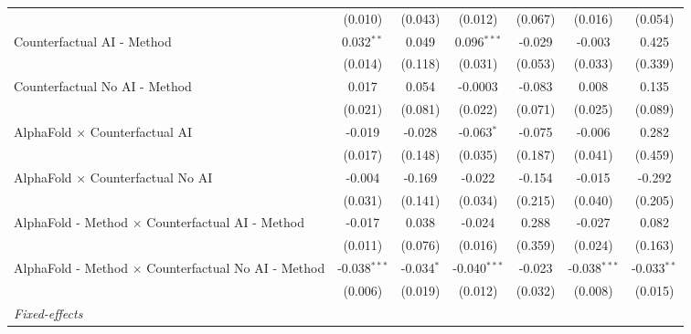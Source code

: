 \begin{tabular}{lcccccc}
                                                              & (0.010)        & (0.043)      & (0.012)        & (0.067)      & (0.016)        & (0.054)\\   
   Counterfactual AI - Method                                 & 0.032$^{**}$   & 0.049        & 0.096$^{***}$  & -0.029       & -0.003         & 0.425\\   
                                                              & (0.014)        & (0.118)      & (0.031)        & (0.053)      & (0.033)        & (0.339)\\   
   Counterfactual No AI - Method                              & 0.017          & 0.054        & -0.0003        & -0.083       & 0.008          & 0.135\\   
                                                              & (0.021)        & (0.081)      & (0.022)        & (0.071)      & (0.025)        & (0.089)\\   
   AlphaFold $\times$ Counterfactual AI                       & -0.019         & -0.028       & -0.063$^{*}$   & -0.075       & -0.006         & 0.282\\   
                                                              & (0.017)        & (0.148)      & (0.035)        & (0.187)      & (0.041)        & (0.459)\\   
   AlphaFold $\times$ Counterfactual No AI                    & -0.004         & -0.169       & -0.022         & -0.154       & -0.015         & -0.292\\   
                                                              & (0.031)        & (0.141)      & (0.034)        & (0.215)      & (0.040)        & (0.205)\\   
   AlphaFold - Method $\times$ Counterfactual AI - Method     & -0.017         & 0.038        & -0.024         & 0.288        & -0.027         & 0.082\\   
                                                              & (0.011)        & (0.076)      & (0.016)        & (0.359)      & (0.024)        & (0.163)\\   
   AlphaFold - Method $\times$ Counterfactual No AI - Method  & -0.038$^{***}$ & -0.034$^{*}$ & -0.040$^{***}$ & -0.023       & -0.038$^{***}$ & -0.033$^{**}$\\   
                                                              & (0.006)        & (0.019)      & (0.012)        & (0.032)      & (0.008)        & (0.015)\\   
   \midrule
   \emph{Fixed-effects}\\

\end{tabular}
